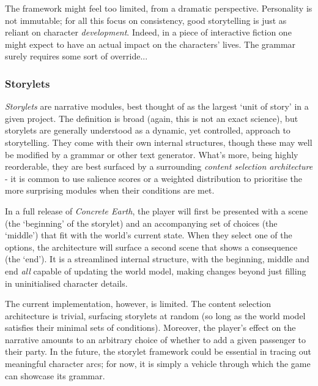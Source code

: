 \documentclass[a4paper, 11pt]{article}
\begin{document}
\begin{flushleft}
\vspace{5pt}\noindent
The framework might feel too limited, from a dramatic perspective. Personality is not immutable; for all this focus on consistency, good storytelling is just as reliant on character \textit{development}. Indeed, in a piece of interactive fiction one might expect to have an actual impact on the characters' lives. The grammar surely requires some sort of override...

\subsubsection{Storylets} 

\textit{Storylets} \citep{kreminskiStorylets} are narrative modules, best thought of as the largest `unit of story' in a given project. The definition is broad (again, this is not an exact science), but storylets are generally understood as a dynamic, yet controlled, approach to storytelling. They come with their own internal structures, though these may well be modified by a grammar or other text generator. What's more, being highly reorderable, they are best surfaced by a surrounding \textit{content selection architecture} - it is common to use salience scores or a weighted distribution to prioritise the more surprising modules when their conditions are met.

\vspace{5pt}\noindent
In a full release of \textit{Concrete Earth}, the player will first be presented with a scene (the `beginning' of the storylet) and an accompanying set of choices (the `middle') that fit with the world's current state. When they select one of the options, the architecture will surface a second scene that shows a consequence (the `end'). It is a streamlined internal structure, with the beginning, middle and end \textit{all} capable of updating the world model, making changes beyond just filling in uninitialised character details.
 
\newpage\noindent
The current implementation, however, is limited. The content selection architecture is trivial, surfacing storylets at random (so long as the world model satisfies their minimal sets of conditions). Moreover, the player's effect on the narrative amounts to an arbitrary choice of whether to add a given passenger to their party. In the future, the storylet framework could be essential in tracing out meaningful character arcs; for now, it is simply a vehicle through which the game can showcase its grammar.


\end{flushleft}
\end{document}
